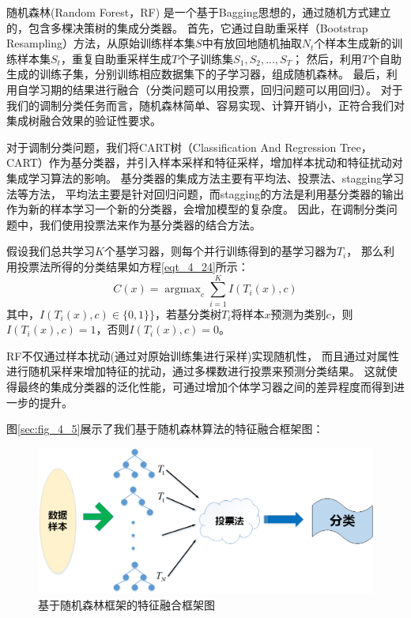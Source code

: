 随机森林(Random Forest，RF) \cite{liaw2002classification}是一个基于Bagging思想的，通过随机方式建立的，包含多棵决策树的集成分类器。
首先，它通过自助重采样（Bootstrap Resampling）方法，从原始训练样本集$S$中有放回地随机抽取$N_t$个样本生成新的训练样本集$S_t$，重复自助重采样生成$T$个子训练集${S_1, S_2, ..., S_T}$；
然后，利用$T$个自助生成的训练子集，分别训练相应数据集下的子学习器，组成随机森林。
最后，利用自学习期的结果进行融合（分类问题可以用投票，回归问题可以用回归）。
对于我们的调制分类任务而言，随机森林简单、容易实现、计算开销小，正符合我们对集成树融合效果的验证性要求。\par

对于调制分类问题，我们将CART树（Classification And Regression Tree，CART）\cite{breiman2017classification}作为基分类器，并引入样本采样和特征采样，增加样本扰动和特征扰动对集成学习算法的影响。
基分类器的集成方法主要有平均法、投票法、stagging学习法等方法，
平均法主要是针对回归问题，而stagging的方法是利用基分类器的输出作为新的样本学习一个新的分类器，会增加模型的复杂度。
因此，在调制分类问题中，我们使用投票法来作为基分类器的结合方法。\par

假设我们总共学习$K$个基学习器，则每个并行训练得到的基学习器为$T_{i}$，
那么利用投票法所得的分类结果如方程\eqref{eqt_4_24}所示：
\begin{equation}
	\label{eqt_4_24}
	C(x) = \mathop{\arg\max}_{c} \sum_{i=1}^{K} I(T_i(x), c)
\end{equation}
其中，$I(T_i(x), c) \in \{0, 1\}\}$，若基分类树$T_{i}$将样本$x$预测为类别$c$，则$I(T_i(x), c)=1$，否则$I(T_i(x), c)=0$。\par

RF不仅通过样本扰动(通过对原始训练集进行采样)实现随机性，
而且通过对属性进行随机采样来增加特征的扰动，通过多棵数进行投票来预测分类结果。
这就使得最终的集成分类器的泛化性能，可通过增加个体学习器之间的差异程度而得到进一步的提升。\par
图\ref{sec:fig_4_5}展示了我们基于随机森林算法的特征融合框架图：
\begin{figure}[!h]
	\centering
	\includegraphics[scale=0.5]{figures/chapter_4/fig_4_4}
	\caption{基于随机森林框架的特征融合框架图}\label{sec:fig_4_4}
\end{figure}

